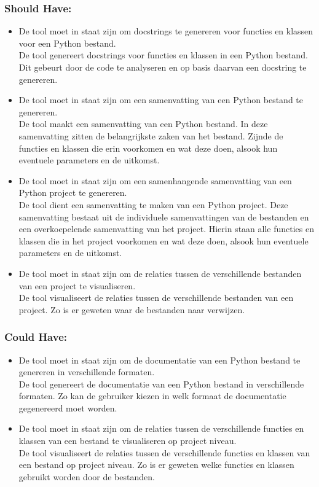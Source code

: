\subsubsection{Should Have:}
\begin{itemize}
    \item De tool moet in staat zijn om docstrings te genereren voor functies en klassen voor een Python bestand.\\
    De tool genereert docstrings voor functies en klassen in een Python bestand. Dit gebeurt door de code te analyseren en op basis daarvan een docstring te genereren.
    \item De tool moet in staat zijn om een samenvatting van een Python bestand te genereren.\\
    De tool maakt een samenvatting van een Python bestand. In deze samenvatting zitten de belangrijkste zaken van het bestand.
    Zijnde de functies en klassen die erin voorkomen en wat deze doen, alsook hun eventuele parameters en de uitkomst.
    \item De tool moet in staat zijn om een samenhangende samenvatting van een Python project te genereren.\\
    De tool dient een samenvatting te maken van een Python project. Deze samenvatting bestaat uit de individuele samenvattingen van de bestanden en een overkoepelende samenvatting van het project.
    Hierin staan alle functies en klassen die in het project voorkomen en wat deze doen, alsook hun eventuele parameters en de uitkomst.
    \item De tool moet in staat zijn om de relaties tussen de verschillende bestanden van een project te visualiseren.\\
    De tool visualiseert  de relaties tussen de verschillende bestanden van een project. Zo is er geweten waar de bestanden naar verwijzen.
\end{itemize}

\subsubsection{Could Have:}
\begin{itemize}
    \item De tool moet in staat zijn om de documentatie van een Python bestand te genereren in verschillende formaten.\\
    De tool genereert de documentatie van een Python bestand in verschillende formaten. Zo kan de gebruiker kiezen in welk formaat de documentatie gegenereerd moet worden.
    \item De tool moet in staat zijn om de relaties tussen de verschillende functies en klassen van een bestand te visualiseren op project niveau.\\
    De tool visualiseert de relaties tussen de verschillende functies en klassen van een bestand op project niveau. Zo is er geweten welke functies en klassen gebruikt worden door de bestanden.
\end{itemize}

